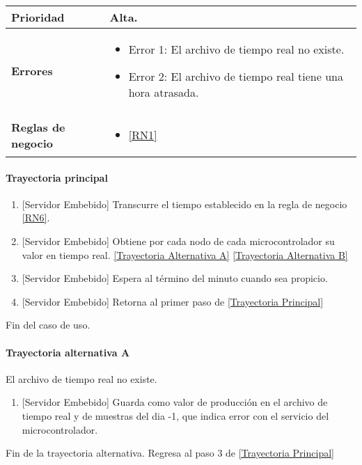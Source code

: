 \begin{longtable}{|J{5cm}|J{10.3cm}|}
	\textbf{Prioridad} & 
		Alta. \\ \hline
	\textbf{Errores} &
		 \begin{itemize}
		 	\item \label{SUB-M-CU1.5:Error1} Error 1: El archivo de tiempo real no existe.
		 	\item \label{SUB-M-CU1.5:Error2} Error 2: El archivo de tiempo real tiene una hora atrasada.
		 \end{itemize} \\ \hline
	\textbf{Reglas de negocio} & 
	    \begin{itemize}
	      \item  \ref{RN1}
		 \end{itemize}\\ \hline
\end{longtable}

\paragraph{Trayectoria principal}
\label{SUB-M-CU1.5:TP}
	\begin{enumerate}
	    \item {[Servidor Embebido]} Transcurre el tiempo establecido en la regla de negocio \ref{RN6}.
	    \item {[Servidor Embebido]} Obtiene por cada nodo de cada microcontrolador su valor en tiempo real. \hyperref[SUB-M-CU1.5:TB]{[Trayectoria Alternativa A]} \hyperref[SUB-M-CU1.5:TB]{[Trayectoria Alternativa B]}
	    \item {[Servidor Embebido]} Espera al término del minuto cuando sea propicio.
		\item {[Servidor Embebido]} Retorna al primer paso de \hyperref[SUB-M-CU1.5:TP]{[Trayectoria Principal]}
	\end{enumerate}
	Fin del caso de uso.

\paragraph{Trayectoria alternativa A} \label{SUB-M-CU1.5:TA}
	El archivo de tiempo real no existe.
	\begin{enumerate}[label=A\arabic*.]
		\item {[Servidor Embebido]} Guarda como valor de producción en el archivo de tiempo real y de muestras del dia -1, que indica error con el servicio del microcontrolador.
	\end{enumerate}
	Fin de la trayectoria alternativa. Regresa al paso 3 de \hyperref[SUB-M-CU1.5:TP]{[Trayectoria Principal]}  

